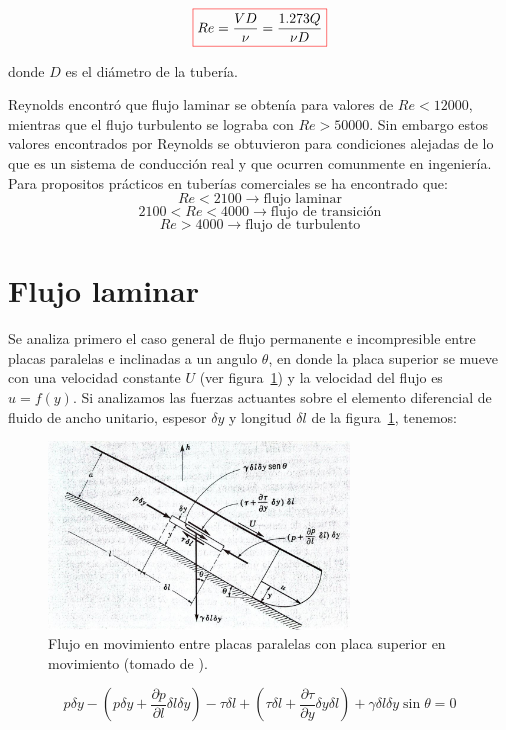 \documentclass[11pt, oneside]{article}
\begin{document}
\begin{equation}
\color{red}\boxed{\color{black} Re = \frac{VD}{\nu} = \frac{1.273Q}{\nu D} }
\label{rey}
\end{equation}

donde $D$ es el di\'ametro de la tuber\'ia. 

Reynolds encontr\'o que flujo laminar se obten\'ia para valores de $Re<12000$, mientras que el flujo turbulento se lograba con $Re>50000$. Sin embargo estos valores encontrados por Reynolds se obtuvieron para condiciones alejadas de lo que es un sistema de conducci\'on real y que ocurren comunmente en ingenier\'ia. Para propositos pr\'acticos en tuber\'ias comerciales se ha encontrado que:
$$
Re < 2100 \rightarrow \text{flujo laminar}
$$
$$
2100 < Re < 4000 \rightarrow \text{flujo de transici\'on}
$$
$$
Re > 4000 \rightarrow \text{flujo de turbulento}
$$ 

\section{Flujo laminar} %
Se analiza primero el caso general de flujo permanente e incompresible entre placas paralelas e inclinadas a un angulo $\theta$, en donde la placa superior se mueve con una velocidad constante $U$ (ver figura~\ref{lami}) y la velocidad del flujo es $u=f(y)$. Si analizamos las fuerzas actuantes sobre el elemento diferencial de fluido de ancho unitario, espesor $\delta y$ y longitud $\delta l$ de la figura~\ref{lami}, tenemos:

\begin{figure}[h]
\centering
\includegraphics[width=8cm]{lami.jpeg}
\caption{Flujo en movimiento entre placas paralelas con placa superior en movimiento (tomado de \cite{streeter}).}
\label{lami}
\end{figure}

\begin{equation}
p \delta y - \left( p \delta y + \frac{\partial p}{\partial l} \delta l \delta y \right)- \tau \delta l + \left( \tau \delta l + \frac{\partial \tau}{\partial y} \delta y \delta l \right) + \gamma \delta l \delta y \sin \theta = 0
\label{lam1}
\end{equation}
\end{document}
